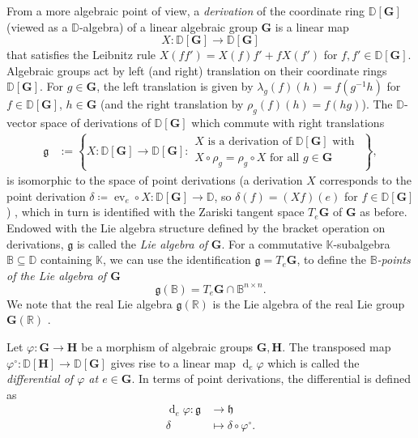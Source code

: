 \documentclass[12pt]{amsart}
\newcommand{\R}{\mathbb{R} }
\newcommand{\D}{\mathbb{D} }
\newcommand{\K}{\mathbb{K}}
\newcommand{\frakg}{\mathfrak{g}}
\newcommand{\frakh}{\mathfrak{h}}
\newcommand{\bG}{\mathbf{G}}
\newcommand{\bH}{\mathbf{H}}
\numberwithin{equation}{section}
\theoremstyle{remark} %
\begin{document}
From a more algebraic point of view, a \emph{derivation} of the coordinate ring $\D[\bG]$ (viewed as a $\D$-algebra) of a linear algebraic group $\bG$ is a linear map
$$
X \colon \D[\bG] \to \D[\bG]
$$
that satisfies the Leibnitz rule $X(ff') = X(f)f' + f X(f')$ for $f,f' \in \D[\bG]$. Algebraic groups act by left (and right) translation on their coordinate rings $\D[\bG]$. For $g \in \bG$, the left translation is given by $\lambda_g (f) (h) = f(g^{-1}h)$ for $f \in \D[\bG]$, $h \in \bG$ (and the right translation by $\rho_g (f) (h) = f(hg)$). The $\D$-vector space of derivations of $\D[\bG]$ which commute with right translations
\begin{align*} 
	\frakg &:= \left\{ X \colon \D[\bG] \to \D[\bG] \colon \begin{matrix}
		X \text{ is a derivation of } \D[\bG] \text{ with }\\
		X\circ \rho_g =\rho_g \circ X \text{ for all }  g \in \bG
	\end{matrix} \right\},
\end{align*}
is isomorphic to the space of point derivations (a derivation $X$ corresponds to the point derivation $\delta \coloneq  \operatorname{ev}_e \circ X \colon \D[\bG] \to \D$, so $\delta(f) = (Xf)(e)$ for $f \in \D[\bG]$) \cite[Theorem 9.1]{Hum1}, which in turn is identified with the Zariski tangent space $T_e\bG$ of $\bG$ as before.
 Endowed with the Lie algebra structure defined by the bracket operation on derivations, $\frakg$ is called the \emph{Lie algebra of} $\bG$. For a commutative $\K$-subalgebra $\mathbb{B} \subseteq \D$ containing $\K$, we can use the identification $\frakg = T_e\bG$, to define the \emph{$\mathbb{B}$-points of the Lie algebra of $\bG$}
 $$
 \frakg(\mathbb{B}) = T_e\bG \cap \mathbb{B}^{n\times n}.
 $$
 We note that the real Lie algebra $\frakg(\R)$ is the Lie algebra of the real Lie group $\bG(\R)$ \cite[Theorem 2.1]{Mil13}.
 
Let $\varphi  \colon \bG \to \bH$ be a morphism of algebraic groups $\bG,\bH$. The transposed map $\varphi^\circ \colon \D[\bH] \to \D[\bG]$ gives rise to a linear map $\operatorname{d}_e\!\varphi$ which is called the \emph{differential of $\varphi$ at $e\in \bG$}. In terms of point derivations, the differential is defined as
\begin{align*}
	\operatorname{d}_e\!\varphi \colon  \frakg  &\to \frakh \\
	\delta &\mapsto \delta \circ \varphi^{\circ} .
\end{align*}
 
\end{document}
